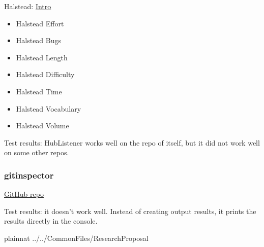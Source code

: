 \documentclass[letterpaper,cleveref]{lipics-v2019}
\theoremstyle{definition}
\begin{document}
Halstead:
\href{https://www.geeksforgeeks.org/software-engineering-halsteads-software-metrics/}{Intro}
\begin{itemize}
\item Halstead Effort
\item Halstead Bugs
\item Halstead Length
\item Halstead Difficulty
\item Halstead Time
\item Halstead Vocabulary
\item Halstead Volume
\end{itemize}

Test results: HubListener works well on the repo of itself, but it did not work
well on some other repos.

\subsubsection{gitinspector}

\href{https://github.com/ejwa/gitinspector}{GitHub repo}

Test results: it doesn't work well. Instead of creating output results, it
prints the results directly in the console.

\newpage

 {plainnat}
 {../../CommonFiles/ResearchProposal}
\end{document}
